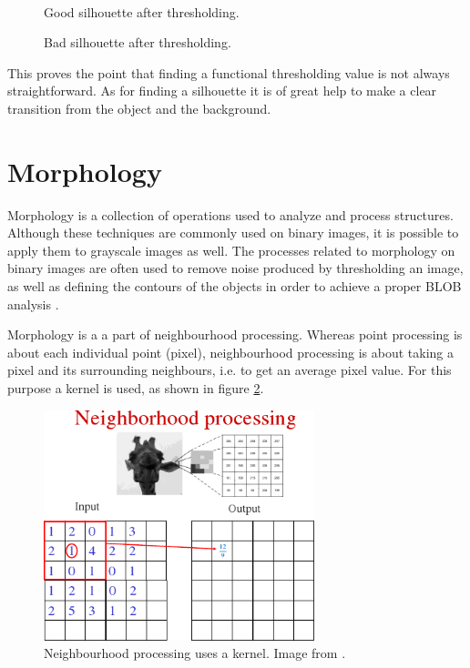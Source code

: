 \begin{figure}[htbp]
\begin{minipage}[b]{0.45\textwidth}
\end{minipage} \\ %
\begin{minipage}[t]{0.45\textwidth}
\caption{Good silhouette after thresholding.} %
\label{fig:SimpleThresholdAfter}
\end{minipage} \hfill
\begin{minipage}[t]{0.45\textwidth}
\caption{Bad silhouette after thresholding.} %
\label{fig:ComplicatedThresholdAfter}
\end{minipage}
\end{figure}
 
This proves the point that finding a functional thresholding value is not always straightforward. As for finding a silhouette it is of great help to make a clear transition from the object and the background.

\section{Morphology}
Morphology is a collection of operations used to analyze and process structures. Although these techniques are commonly used on binary images, it is possible to apply them to grayscale images as well. The processes related to morphology on binary images are often used to remove noise produced by thresholding an image, as well as defining the contours of the objects in order to achieve a proper BLOB analysis \citep{ip_book}.

Morphology is a a part of neighbourhood processing. Whereas point processing is about each individual point (pixel), neighbourhood processing is about taking a pixel and its surrounding neighbours, i.e. to get an average pixel value. For this purpose a kernel is used, as shown in figure \ref{fig:kernel}. %

\begin{figure}[htbp]
\centering
\includegraphics[width=0.7\textwidth]{Pictures/Theory/kernel}
\caption{Neighbourhood processing uses a kernel. Image from \citep{ip_book}.}
\label{fig:kernel}
\end{figure}

